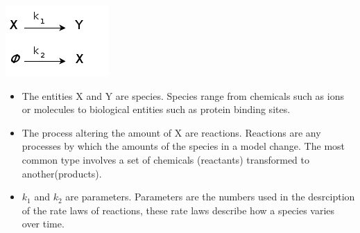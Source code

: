 \documentclass[portrait,a0paper,fontscale=0.35]{baposter}
\begin{document}
\begin{poster}
{\begin{multicols}{2}
 \includegraphics[scale=0.4]{Poster-images/TermDiagram.png}
 
 \begin{itemize}
 \item The entities X and Y are species. Species range from chemicals such as ions or molecules to biological entities such as protein binding sites.
  
 \item The process altering the amount of X are reactions. Reactions are any processes by which the amounts of the species in a model change. The most common type involves a set of chemicals (reactants) transformed to another(products).
 
 \item $k_1$ and $k_2$ are parameters. Parameters are the numbers used in the desrciption of the rate laws of reactions, these rate laws describe how a species varies over time.
 
 \end{itemize}
 \end{multicols}
 }
 
 

\end{poster}
\end{document}

